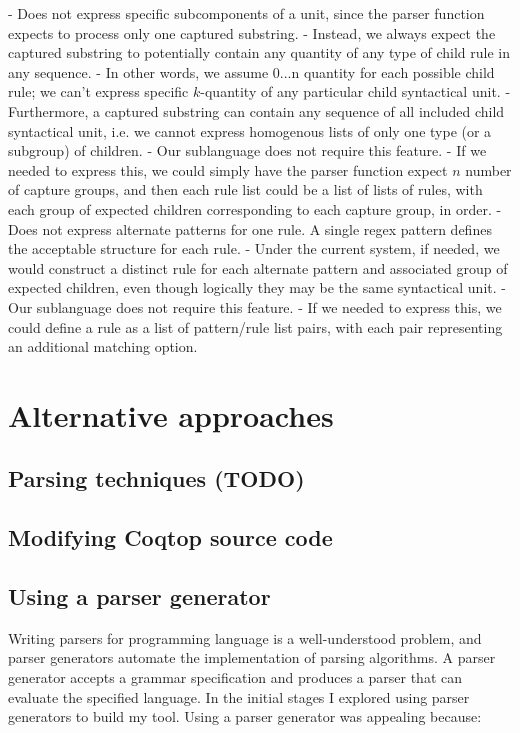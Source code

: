 - Does not express specific subcomponents of a unit, since the parser function expects to process only one captured substring.
- Instead, we always expect the captured substring to potentially contain any quantity of any type of child rule in any sequence.
- In other words, we assume 0...n quantity for each possible child rule; we can't express specific $k$-quantity of any particular child syntactical unit.
- Furthermore, a captured substring can contain any sequence of all included child syntactical unit, i.e. we cannot express homogenous lists of only one type (or a subgroup) of children.
- Our sublanguage does not require this feature.
- If we needed to express this, we could simply have the parser function expect $n$ number of capture groups, and then each rule list could be a list of lists of rules, with each group of expected children corresponding to each capture group, in order.
- Does not express alternate patterns for one rule. A single regex pattern defines the acceptable structure for each rule.
- Under the current system, if needed, we would construct a distinct rule for each alternate pattern and associated group of expected children, even though logically they may be the same syntactical unit.
- Our sublanguage does not require this feature.
- If we needed to express this, we could define a rule as a list of pattern/rule list pairs, with each pair representing an additional matching option.

\section{Alternative approaches}

\subsection{Parsing techniques  (TODO)}
\subsection{Modifying Coqtop source code}


\subsection{ Using a parser generator}

Writing parsers for programming language is a well-understood problem, and parser generators automate the implementation of parsing algorithms.  A parser generator accepts a grammar specification and produces a parser that can evaluate the specified language. In the initial stages I explored using parser generators to build my tool. Using a parser generator was appealing because:


